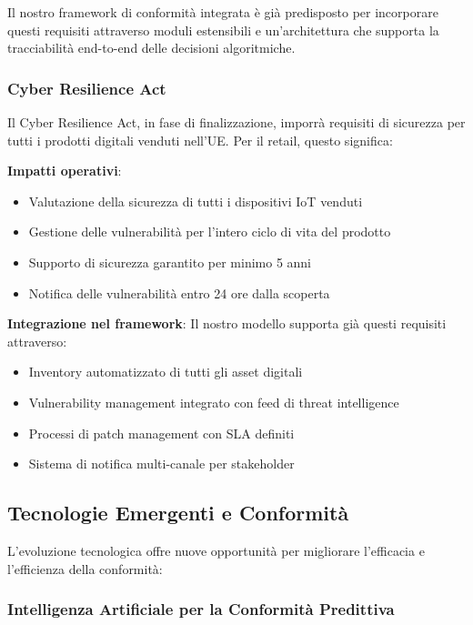 Il nostro framework di conformità integrata è già predisposto per incorporare questi requisiti attraverso moduli estensibili e un'architettura che supporta la tracciabilità end-to-end delle decisioni algoritmiche.

\subsubsection{Cyber Resilience Act}

Il Cyber Resilience Act, in fase di finalizzazione, imporrà requisiti di sicurezza per tutti i prodotti digitali venduti nell'UE. Per il retail, questo significa:

\textbf{Impatti operativi}:
\begin{itemize}
    \item Valutazione della sicurezza di tutti i dispositivi IoT venduti
    \item Gestione delle vulnerabilità per l'intero ciclo di vita del prodotto
    \item Supporto di sicurezza garantito per minimo 5 anni
    \item Notifica delle vulnerabilità entro 24 ore dalla scoperta
\end{itemize}

\textbf{Integrazione nel framework}:
Il nostro modello supporta già questi requisiti attraverso:
\begin{itemize}
    \item Inventory automatizzato di tutti gli asset digitali
    \item Vulnerability management integrato con feed di threat intelligence
    \item Processi di patch management con SLA definiti
    \item Sistema di notifica multi-canale per stakeholder
\end{itemize}

\subsection{Tecnologie Emergenti e Conformità}
\label{subsec:4.9.2_tecnologie}

L'evoluzione tecnologica offre nuove opportunità per migliorare l'efficacia e l'efficienza della conformità:

\subsubsection{Intelligenza Artificiale per la Conformità Predittiva}

